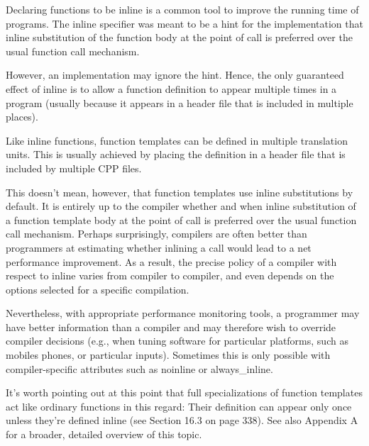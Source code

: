 Declaring functions to be inline is a common tool to improve the running time of programs. The inline specifier was meant to be a hint for the implementation that inline substitution of the function body at the point of call is preferred over the usual function call mechanism.

However, an implementation may ignore the hint. Hence, the only guaranteed effect of inline is to allow a function definition to appear multiple times in a program (usually because it appears in a header file that is included in multiple places).

Like inline functions, function templates can be defined in multiple translation units. This is usually achieved by placing the definition in a header file that is included by multiple CPP files.

This doesn’t mean, however, that function templates use inline substitutions by default. It is entirely up to the compiler whether and when inline substitution of a function template body at the point of call is preferred over the usual function call mechanism. Perhaps surprisingly, compilers are often better than programmers at estimating whether inlining a call would lead to a net performance improvement. As a result, the precise policy of a compiler with respect to inline varies from compiler to compiler, and even depends on the options selected for a specific compilation.

Nevertheless, with appropriate performance monitoring tools, a programmer may have better information than a compiler and may therefore wish to override compiler decisions (e.g., when tuning software for particular platforms, such as mobiles phones, or particular inputs). Sometimes this is only possible with compiler-specific attributes such as noinline or always\_inline.

It’s worth pointing out at this point that full specializations of function templates act like ordinary functions in this regard: Their definition can appear only once unless they’re defined inline (see Section 16.3 on page 338). See also Appendix A for a broader, detailed overview of this topic.


























